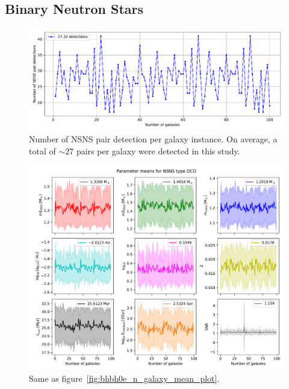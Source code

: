 \subsection{Binary Neutron Stars}
\begin{figure}[!h]
    \centering
    \includegraphics[width=\columnwidth]{analysis_data/004__images_for_latex/NSNS0e_n_detections}
    \caption{Number of NSNS pair detection per galaxy instance. On average, a total of $\sim$27 pairs per galaxy were detected in this study.}
    \label{fig:nsns0endetections}
\end{figure}

\begin{figure}[!h]
    \centering
    \includegraphics[width=\columnwidth]{analysis_data/004__images_for_latex/NSNS0e_n_galaxy_mean_plot}
    \caption{Same as figure~\ref{fig:bhbh0e_n_galaxy_mean_plot}.}
    \label{fig:nsns0e_n_galaxy_mean_plot}
\end{figure}


\newpage
